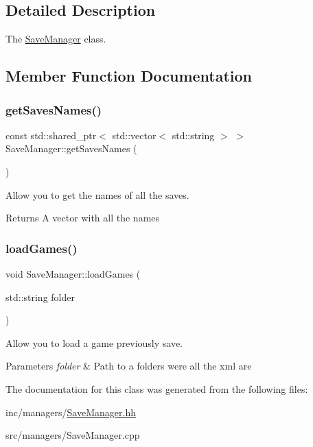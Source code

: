 \subsection{Detailed Description}
The \hyperlink{classSaveManager}{Save\+Manager} class. 

\subsection{Member Function Documentation}
\mbox{\label{classSaveManager_a335611df31b6a1eccb5c7df73bc2e778}} 
\subsubsection{\texorpdfstring{get\+Saves\+Names()}{getSavesNames()}}
{\footnotesize\ttfamily const std\+::shared\+\_\+ptr$<$ std\+::vector$<$ std\+::string $>$ $>$ Save\+Manager\+::get\+Saves\+Names (\begin{DoxyParamCaption}{ }\end{DoxyParamCaption})}



Allow you to get the names of all the saves. 

\begin{DoxyReturn}{Returns}
A vector with all the names 
\end{DoxyReturn}
\mbox{\label{classSaveManager_a96c17debbf9765e8c71e74010621585f}} 
\subsubsection{\texorpdfstring{load\+Games()}{loadGames()}}
{\footnotesize\ttfamily void Save\+Manager\+::load\+Games (\begin{DoxyParamCaption}\item[{std\+::string}]{folder }\end{DoxyParamCaption})}



Allow you to load a game previously save. 


\begin{DoxyParams}{Parameters}
{\em folder} & Path to a folders were all the xml are \\
\hline
\end{DoxyParams}


The documentation for this class was generated from the following files\+:\begin{DoxyCompactItemize}
\item 
inc/managers/\hyperlink{SaveManager_8hh}{Save\+Manager.\+hh}\item 
src/managers/Save\+Manager.\+cpp\end{DoxyCompactItemize}
